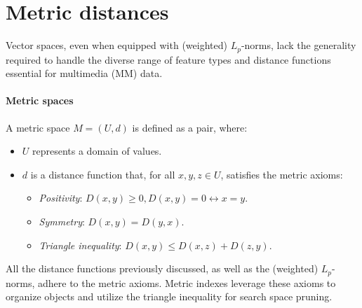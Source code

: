 \section{Metric distances}

Vector spaces, even when equipped with (weighted) $L_p$-norms, lack the generality required to handle the diverse range of feature types and distance functions essential for multimedia (MM) data.

\paragraph*{Metric spaces}
A metric space $M = (U,d)$ is defined as a pair, where:
\begin{itemize}
    \item $U$ represents a domain of values.
    \item $d$ is a distance function that, for all $x, y, z \in U$, satisfies the metric axioms:
        \begin{itemize}
            \item \textit{Positivity}: $D(x,y) \geq 0, D(x,y) = 0 \leftrightarrow x = y$.
            \item \textit{Symmetry}: $D(x,y) = D(y,x)$. 
            \item \textit{Triangle inequality}: $D(x,y) \leq D(x,z) + D(z,y)$. 
        \end{itemize}
\end{itemize}
All the distance functions previously discussed, as well as the (weighted) $L_p$-norms, adhere to the metric axioms. 
Metric indexes leverage these axioms to organize objects and utilize the triangle inequality for search space pruning.

